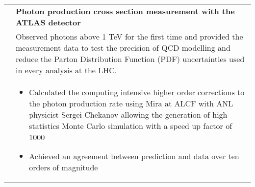\documentclass[a4paper,10pt]{article}
\begin{document}
\begin{tabularx}{\textwidth}{>{\centering\arraybackslash}X p{} }
  {\sl 2014--2015} & {\bf Photon production cross section measurement with the ATLAS detector}  \\
  & Observed photons above 1 TeV for the first time and provided the measurement data to test the precision of QCD modelling and reduce the
  Parton Distribution Function (PDF) uncertainties used in every analysis at the LHC. \\
  & \begin{itemize}
  \item Calculated the computing intensive higher order corrections to the photon production rate using Mira at ALCF with ANL
    physicist Sergei Chekanov allowing the generation of high statistics Monte Carlo simulation with a speed up factor of 1000
  \item Achieved an agreement between prediction and data over ten orders of magnitude
  \end{itemize}\\
\end{tabularx}

\vspace{3mm}
\end{document}
